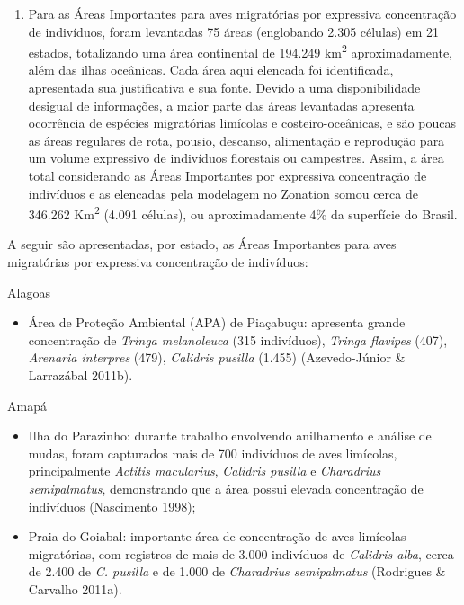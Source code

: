 \documentclass[
]{scrbook}
\providecommand{\tightlist}{%
  \setlength{\itemsep}{0pt}\setlength{\parskip}{0pt}}
\begin{document}
\begin{enumerate}
\def\labelenumi{(\arabic{enumi})}
\setcounter{enumi}{1}
\tightlist
\item
  Para as Áreas Importantes para aves migratórias por expressiva concentração de indivíduos, foram levantadas 75 áreas (englobando 2.305 células) em 21 estados, totalizando uma área continental de 194.249 km\textsuperscript{2} aproximadamente, além das ilhas oceânicas. Cada área aqui elencada foi identificada, apresentada sua justificativa e sua fonte. Devido a uma disponibilidade desigual de informações, a maior parte das áreas levantadas apresenta ocorrência de espécies migratórias limícolas e costeiro-oceânicas, e são poucas as áreas regulares de rota, pousio, descanso, alimentação e reprodução para um volume expressivo de indivíduos florestais ou campestres. Assim, a área total considerando as Áreas Importantes por expressiva concentração de indivíduos e as elencadas pela modelagem no Zonation somou cerca de 346.262 Km\textsuperscript{2} (4.091 células), ou aproximadamente 4\% da superfície do Brasil.
\end{enumerate}

A seguir são apresentadas, por estado, as Áreas Importantes para aves migratórias por expressiva concentração de indivíduos:

Alagoas

\begin{itemize}
\tightlist
\item
  Área de Proteção Ambiental (APA) de Piaçabuçu: apresenta grande concentração de \emph{Tringa melanoleuca} (315 indivíduos), \emph{Tringa flavipes} (407), \emph{Arenaria interpres} (479), \emph{Calidris pusilla} (1.455) (Azevedo-Júnior \& Larrazábal 2011b).
\end{itemize}

Amapá

\begin{itemize}
\item
  Ilha do Parazinho: durante trabalho envolvendo anilhamento e análise de mudas, foram capturados mais de 700 indivíduos de aves limícolas, principalmente \emph{Actitis macularius}, \emph{Calidris pusilla} e \emph{Charadrius semipalmatus}, demonstrando que a área possui elevada concentração de indivíduos (Nascimento 1998);
\item
  Praia do Goiabal: importante área de concentração de aves limícolas migratórias, com registros de mais de 3.000 indivíduos de \emph{Calidris alba}, cerca de 2.400 de \emph{C. pusilla} e de 1.000 de \emph{Charadrius semipalmatus} (Rodrigues \& Carvalho 2011a).
\end{itemize}
\end{document}
